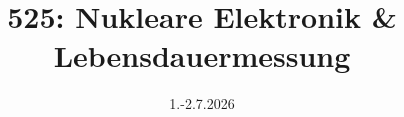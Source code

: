 
\usepackage[headsepline=true,markcase=upper]{scrlayer-scrpage}

\title{525: Nukleare Elektronik \& Lebensdauermessung}

\date{1.-2.7.2026}





\maketitle

\tableofcontents















\printbibliography


